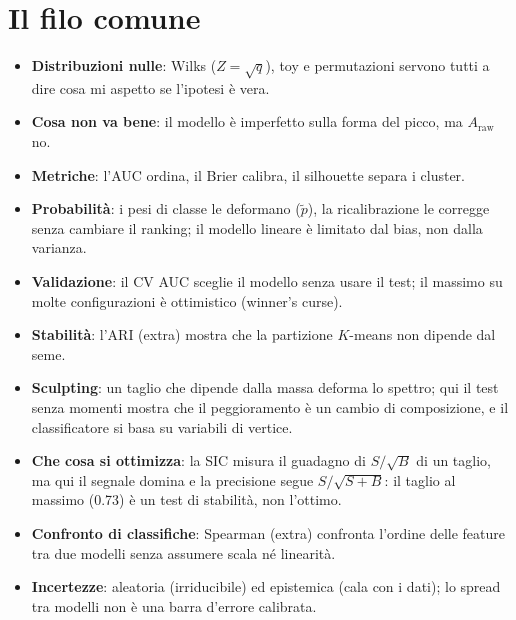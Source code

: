\documentclass[10.5pt,a4paper]{article}
\newcommand{\Araw}{A_{\mathrm{raw}}}
\begin{document}
\section*{Il filo comune}
\begin{itemize}
\item \textbf{Distribuzioni nulle}: Wilks ($Z=\sqrt q$), toy e permutazioni servono tutti a dire cosa mi aspetto se l'ipotesi è vera.
\item \textbf{Cosa non va bene}: il modello è imperfetto sulla forma del picco, ma $\Araw$ no.
\item \textbf{Metriche}: l'AUC ordina, il Brier calibra, il silhouette separa i cluster.
\item \textbf{Probabilità}: i pesi di classe le deformano ($\tilde p$), la ricalibrazione le corregge senza cambiare il ranking; il modello lineare è limitato dal bias, non dalla varianza.
\item \textbf{Validazione}: il CV AUC sceglie il modello senza usare il test; il massimo su molte configurazioni è ottimistico (winner's curse).
\item \textbf{Stabilità}: l'ARI (extra) mostra che la partizione $K$-means non dipende dal seme.
\item \textbf{Sculpting}: un taglio che dipende dalla massa deforma lo spettro; qui il test senza momenti mostra che il peggioramento è un cambio di composizione, e il classificatore si basa su variabili di vertice.
\item \textbf{Che cosa si ottimizza}: la SIC misura il guadagno di $S/\sqrt B$ di un taglio, ma qui il segnale domina e la precisione segue $S/\sqrt{S+B}$: il taglio al massimo (0.73) è un test di stabilità, non l'ottimo.
\item \textbf{Confronto di classifiche}: Spearman (extra) confronta l'ordine delle feature tra due modelli senza assumere scala né linearità.
\item \textbf{Incertezze}: aleatoria (irriducibile) ed epistemica (cala con i dati); lo spread tra modelli non è una barra d'errore calibrata.
\end{itemize}
\end{document}
